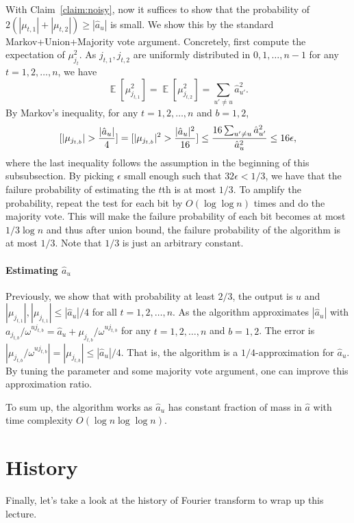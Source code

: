 \documentclass[11pt]{article}
\DeclareMathOperator*{\E}{\mathbb{E}}
\let\Pr\relax
\DeclareMathOperator*{\Pr}{\mathbb{P}}
\begin{document}
With Claim~\ref{claim:noisy}, now it suffices to show that the probability of $2(|\mu_{t,1}|+|\mu_{t,2}|)\geq|\hat{a}_u|$ is small. We show this by the standard Markov+Union+Majority vote argument. Concretely, first compute the expectation of $\mu_{j_t}^2$. As $j_{t,1},j_{t,2}$ are uniformly distributed in $0,1,\dots,n-1$ for any $t=1,2,\dots,n$, we have
\begin{equation}
\E[\mu_{j_{t,1}}^2]=\E[\mu_{j_{t,2}}^2]=\sum_{u'\neq u}\hat{a}_{u'}^2.
\end{equation}
By Markov's inequality, for any $t=1,2,\dots,n$ and $b=1,2$,
\begin{equation}
\Pr[|\mu_{j_{t,b}}|>\frac{|\hat{a}_u|}{4}] = \Pr[|\mu_{j_{t,b}}|^2>\frac{|\hat{a}_u|^2}{16}]\leq\frac{16\sum_{u'\neq u}\hat{a}_{u'}^2}{\hat{a}_u^2}\leq16\epsilon,
\end{equation}
where the last inequality follows the assumption in the beginning of this subsubsection. By picking $\epsilon$ small enough such that $32\epsilon<1/3$, we have that the failure probability of estimating the $t$th is at most $1/3$. To amplify the probability, repeat the test for each bit by $O(\log\log n)$ times and do the majority vote. This will make the failure probability of each bit becomes at most $1/3\log n$ and thus after union bound, the failure probability of the algorithm is at most $1/3$. Note that $1/3$ is just an arbitrary constant.


\paragraph{Estimating $\hat{a}_u$}
Previously, we show that with probability at least $2/3$, the output is $u$ and $|\mu_{j_{t,1}}|,|\mu_{j_{t,1}}|\leq|\hat{a}_u|/4$ for all $t=1,2,\dots,n$. As the algorithm approximates $|\hat{a}_u|$ with $a_{j_{t,b}}/\omega^{uj_{t,b}}=\hat{a}_u+\mu_{j_{t,b}}/\omega^{uj_{t,b}}$ for any $t=1,2,\dots,n$ and $b=1,2$. The error is $|\mu_{j_{t,b}}/\omega^{uj_{t,b}}|=|\mu_{j_{t,b}}|\leq|\hat{a}_u|/4$. That is, the algorithm is a $1/4$-approximation for $\hat{a}_u$. By tuning the parameter and some majority vote argument, one can improve this approximation ratio.

To sum up, the algorithm works as $\hat{a}_u$ has constant fraction of mass in $\hat{a}$ with time complexity $O(\log n\log\log n)$.


\section{History}\label{sec:history}
Finally, let's take a look at the history of Fourier transform to wrap up this lecture. 
\end{document}
